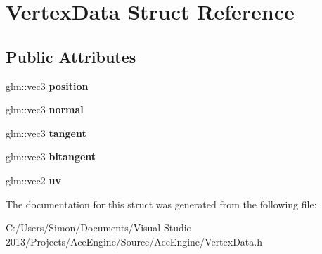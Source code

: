 \hypertarget{struct_vertex_data}{}\section{Vertex\+Data Struct Reference}
\label{struct_vertex_data}
\subsection*{Public Attributes}
\begin{DoxyCompactItemize}
\item 
\hypertarget{struct_vertex_data_a2b9e13ce103a07c15e8769d7c2193702}{}glm\+::vec3 {\bfseries position}\label{struct_vertex_data_a2b9e13ce103a07c15e8769d7c2193702}

\item 
\hypertarget{struct_vertex_data_a62c7802a045b5cf3055bceead2472e41}{}glm\+::vec3 {\bfseries normal}\label{struct_vertex_data_a62c7802a045b5cf3055bceead2472e41}

\item 
\hypertarget{struct_vertex_data_a59d18bd0c51f802ad63a000d2521e9dc}{}glm\+::vec3 {\bfseries tangent}\label{struct_vertex_data_a59d18bd0c51f802ad63a000d2521e9dc}

\item 
\hypertarget{struct_vertex_data_adebd633d522750161e34c9659e2ed235}{}glm\+::vec3 {\bfseries bitangent}\label{struct_vertex_data_adebd633d522750161e34c9659e2ed235}

\item 
\hypertarget{struct_vertex_data_a7ff3d9f97b6a18665dcf3e43117eb1fb}{}glm\+::vec2 {\bfseries uv}\label{struct_vertex_data_a7ff3d9f97b6a18665dcf3e43117eb1fb}

\end{DoxyCompactItemize}


The documentation for this struct was generated from the following file\+:\begin{DoxyCompactItemize}
\item 
C\+:/\+Users/\+Simon/\+Documents/\+Visual Studio 2013/\+Projects/\+Ace\+Engine/\+Source/\+Ace\+Engine/Vertex\+Data.\+h\end{DoxyCompactItemize}
